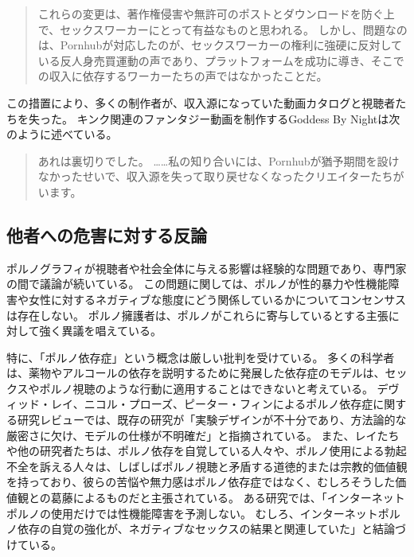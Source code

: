 \documentclass[paper=a4,book,openany]{jlreq}
\begin{document}
\begin{quote}
これらの変更は、著作権侵害や無許可のポストとダウンロードを防ぐ上で、セックスワーカーにとって有益なものと思われる。
しかし、問題なのは、Pornhubが対応したのが、セックスワーカーの権利に強硬に反対している反人身売買運動の声であり、プラットフォームを成功に導き、そこでの収入に依存するワーカーたちの声ではなかったことだ。
\citep{toronto21:_what_do_pornh_chang_mean_sex_worker}
\end{quote}

この措置により、多くの制作者が、収入源になっていた動画カタログと視聴者たちを失った。
キンク関連のファンタジー動画を制作するGoddess By Nightは次のように述べている。

\begin{quote}
あれは裏切りでした。
……私の知り合いには、Pornhubが猶予期間を設けなかったせいで、収入源を失って取り戻せなくなったクリエイターたちがいます。
\citep{cole20:_pornh_conten_purge_has_left}
\end{quote}

\subsection{他者への危害に対する反論}

ポルノグラフィが視聴者や社会全体に与える影響は経験的な問題であり、専門家の間で議論が続いている。
この問題に関しては、ポルノが性的暴力や性機能障害や女性に対するネガティブな態度にどう関係しているかについてコンセンサスは存在しない。
ポルノ擁護者は、ポルノがこれらに寄与しているとする主張に対して強く異議を唱えている。

特に、「ポルノ依存症」という概念は厳しい批判を受けている。
多くの科学者は、薬物やアルコールの依存を説明するために発展した依存症のモデルは、セックスやポルノ視聴のような行動に適用することはできないと考えている。
デヴィッド・レイ、ニコル・プローズ、ピーター・フィンによるポルノ依存症に関する研究レビューでは、既存の研究が「実験デザインが不十分であり、方法論的な厳密さに欠け、モデルの仕様が不明確だ」と指摘されている。
また、レイたちや他の研究者たちは、ポルノ依存を自覚している人々や、ポルノ使用による勃起不全を訴える人々は、しばしばポルノ視聴と矛盾する道徳的または宗教的価値観を持っており、彼らの苦悩や無力感はポルノ依存症ではなく、むしろそうした価値観との葛藤によるものだと主張されている\citep[p.105]{ley14:_emper_has_no_cloth}。
ある研究では、「インターネットポルノの使用だけでは性機能障害を予測しない。
むしろ、インターネットポルノ依存の自覚の強化が、ネガティブなセックスの結果と関連していた」と結論づけている\citep{whelan21:_pornog_addic}。
\end{document}
